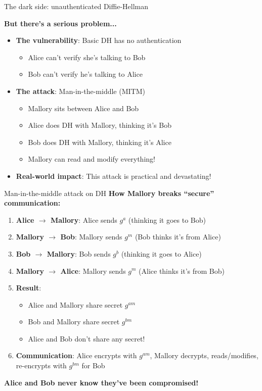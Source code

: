 \documentclass[aspectratio=169, lualatex, handout]{beamer}
\begin{document}
\begin{frame}{The dark side: unauthenticated Diffie-Hellman}
	\begin{center}
		\Large\textbf{But there's a serious problem...}
	\end{center}
	\vspace{0.5cm}
	\begin{itemize}[<+->]
		\item \textbf{The vulnerability}: Basic DH has no authentication
		      \begin{itemize}
			      \item Alice can't verify she's talking to Bob
			      \item Bob can't verify he's talking to Alice
		      \end{itemize}
		\item \textbf{The attack}: Man-in-the-middle (MITM)
		      \begin{itemize}
			      \item Mallory sits between Alice and Bob
			      \item Alice does DH with Mallory, thinking it's Bob
			      \item Bob does DH with Mallory, thinking it's Alice
			      \item Mallory can read and modify everything!
		      \end{itemize}
		\item \textbf{Real-world impact}: This attack is practical and devastating!
	\end{itemize}
\end{frame}

\begin{frame}{Man-in-the-middle attack on DH}
	\textbf{How Mallory breaks ``secure'' communication:}
	\vspace{0.5cm}
	\begin{enumerate}[<+->]
		\item \textbf{Alice $\rightarrow$ Mallory}: Alice sends $g^a$ (thinking it goes to Bob)
		\item \textbf{Mallory $\rightarrow$ Bob}: Mallory sends $g^m$ (Bob thinks it's from Alice)
		\item \textbf{Bob $\rightarrow$ Mallory}: Bob sends $g^b$ (thinking it goes to Alice)
		\item \textbf{Mallory $\rightarrow$ Alice}: Mallory sends $g^m$ (Alice thinks it's from Bob)
		\item \textbf{Result}:
		      \begin{itemize}
			      \item Alice and Mallory share secret $g^{am}$
			      \item Bob and Mallory share secret $g^{bm}$
			      \item Alice and Bob don't share any secret!
		      \end{itemize}
		\item \textbf{Communication}: Alice encrypts with $g^{am}$, Mallory decrypts, reads/modifies, re-encrypts with $g^{bm}$ for Bob
	\end{enumerate}
	\vspace{0.5cm}
	\textbf{Alice and Bob never know they've been compromised!}
\end{frame}
\end{document}
